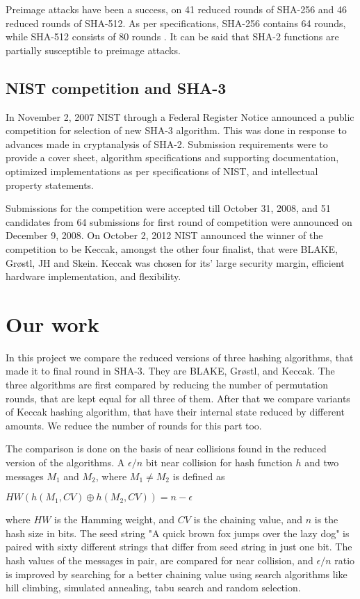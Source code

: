   Preimage attacks have been a success, on 41 reduced rounds of SHA-256 and 46 reduced rounds of SHA-512. 
  As per specifications, SHA-256 contains 64 rounds, while SHA-512 consists of 80 rounds \cite{00011}. It can be
  said that SHA-2 functions are partially susceptible to preimage attacks.

  \subsection{NIST competition and SHA-3}

  In November 2, 2007 NIST through a Federal Register Notice announced a public competition for selection of
  new SHA-3 algorithm. This was done in response to advances made in cryptanalysis of SHA-2.
  Submission requirements were to provide a cover sheet, algorithm specifications and supporting
  documentation, optimized implementations as per specifications of NIST, and intellectual property statements.

  Submissions for the competition were accepted till October 31, 2008, and 51 candidates from 64 submissions
  for first round of competition were announced on December 9, 2008. On October 2, 2012 NIST announced the 
  winner of the competition to be Keccak, amongst the other four finalist, that were BLAKE, Gr{\o}stl, JH
  and Skein. Keccak was chosen for its' large security margin, efficient hardware implementation, and 
  flexibility.
  
\section{Our work}

In this project we compare the reduced versions of three hashing algorithms, that made it to final round in SHA-3.
They are BLAKE, Gr{\o}stl, and Keccak. The three algorithms are first compared by reducing the number of
permutation rounds, that are kept equal for all three of them. After that we compare variants of Keccak hashing
algorithm, that have their internal state reduced by different amounts. We reduce the number of rounds for this
part too.

The comparison is done on the basis of near collisions found in the reduced version of the algorithms. A
$\epsilon / n $ bit near collision for hash function $h$ and two messages $M_{1}$ and $M_{2}$, where 
$M_{1} \neq M_{2}$ is defined as
\begin{center}$ HW( h( M_{1}, CV ) \oplus h( M_{2}, CV ) ) = n - \epsilon $\end{center}
where $HW$ is the Hamming weight, and $CV$ is the chaining value, and $n$ is the hash size in bits. The seed string
"A quick brown fox jumps over the lazy dog" is paired with sixty different strings that differ from seed string
in just one bit. The hash values of the messages in pair, are compared for near collision, and $\epsilon / n$
ratio is improved by searching for a better chaining value using search algorithms like hill climbing, simulated 
annealing, tabu search and random selection.

